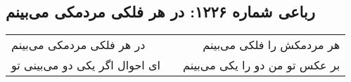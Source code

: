 \begin{center}
\section*{رباعی شماره ۱۲۲۶: در هر فلکی مردمکی می‌بینم}
\label{sec:1226}
\begin{longtable}{l p{0.5cm} r}
در هر فلکی مردمکی می‌بینم
&&
هر مردمکش را فلکی می‌بینم
\\
ای احوال اگر یکی دو می‌بینی تو
&&
بر عکس تو من دو را یکی می‌بینم
\\
\end{longtable}
\end{center}
